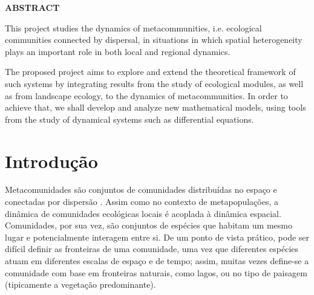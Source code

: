 \documentclass[12pt]{extarticle}
\begin{document}
\setlength{\parindent}{20pt}
\thispagestyle{empty}
\begin{center}
    \bf \Large \color{blue} ABSTRACT
\end{center}
\vskip 3.0cm
{\it


    This project studies the dynamics of metacommunities, i.e.
    ecological communities connected by dispersal, in situations in which
    spatial heterogeneity plays an important role in both local and regional
    dynamics.

    The proposed project aims to explore and extend the theoretical framework
    of such systems by integrating results from the study of ecological modules,
    as well as from landscape ecology, to the dynamics of metacommunities. In
    order to achieve that, we shall develop and analyze new mathematical
    models, using tools from the study of dynamical systems such as
    differential equations.

}

\newpage
\setcounter{page}{1}
\onehalfspacing

\section{Introdução}

Metacomunidades são conjuntos de comunidades distribuídas no espaço e
conectadas por dispersão \citep{hanski1991, holyoak2005}. Assim como no
contexto de metapopulações, a dinâmica de comunidades ecológicas locais é
acoplada à dinâmica espacial.  Comunidades, por sua vez, são conjuntos de
espécies que habitam um mesmo lugar e potencialmente interagem entre si. De um
ponto de vista prático, pode ser difícil definir as fronteiras de uma
comunidade, uma vez que diferentes espécies atuam em diferentes escalas de
espaço e de tempo; assim, muitas vezes define-se a comunidade com base em
fronteiras naturais, como lagos, ou no tipo de paisagem (tipicamente a
vegetação predominante).
\end{document}
